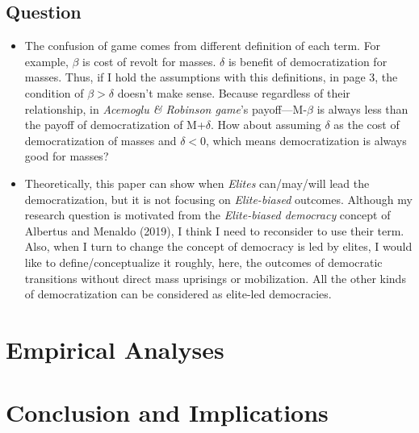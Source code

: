 \documentclass[11pt, letterpage]{article}
\begin{document}
\subsection*{Question}
\begin{itemize}
	\item The confusion of game comes from different definition of each term. For example, $\beta$ is cost of revolt for masses. $\delta$ is benefit of democratization for masses. Thus, if I hold the assumptions with this definitions, in page 3, the condition of $\beta > \delta$ doesn't make sense. Because regardless of their relationship, in \textit{Acemoglu \& Robinson game}'s payoff---M-$\beta$ is always less than the payoff of democratization of M+$\delta$. How about assuming $\delta$ as the cost of democratization of masses and $\delta <0$, which means democratization is always good for masses?
	\item Theoretically, this paper can show when \textit{Elites} can/may/will lead the democratization, but it is not focusing on \textit{Elite-biased} outcomes. Although my research question is motivated from the \textit{Elite-biased democracy} concept of Albertus and Menaldo (2019), I think I need to reconsider to use their term. Also, when I turn to change the concept of democracy is led by elites, I would like to define/conceptualize it roughly, here, the outcomes of democratic transitions without direct mass uprisings or mobilization. All the other kinds of democratization can be considered as elite-led democracies.
\end{itemize}

\section*{Empirical Analyses}

\section*{Conclusion and Implications}

	
	
	
\end{document}
